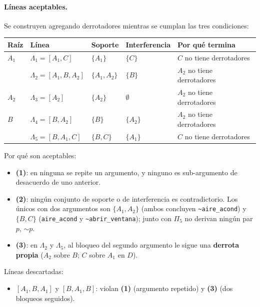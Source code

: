 \documentclass[11pt,a4paper]{article}
\newcommand{\nf}{\textasciitilde}                 %
\begin{document}
\paragraph{Líneas aceptables.} Se construyen agregando derrotadores mientras se cumplan las tres condiciones:
\begin{center}
\small
\begin{tabularx}{\linewidth}{@{}l l l l X@{}}
\toprule
\textbf{Raíz} & \textbf{Línea} & \textbf{Soporte} & \textbf{Interferencia} & \textbf{Por qué termina} \\
\midrule
$A_1$ & $\Lambda_1 = [A_1, C]$ & $\{A_1\}$ & $\{C\}$ & $C$ no tiene derrotadores \\
 & $\Lambda_2 = [A_1, B, A_2]$ & $\{A_1, A_2\}$ & $\{B\}$ & $A_2$ no tiene derrotadores \\
\midrule
$A_2$ & $\Lambda_3 = [A_2]$ & $\{A_2\}$ & $\emptyset$ & $A_2$ no tiene derrotadores \\
\midrule
$B$ & $\Lambda_4 = [B, A_2]$ & $\{B\}$ & $\{A_2\}$ & $A_2$ no tiene derrotadores \\
 & $\Lambda_5 = [B, A_1, C]$ & $\{B, C\}$ & $\{A_1\}$ & $C$ no tiene derrotadores \\
\bottomrule
\end{tabularx}
\end{center}

Por qué son aceptables:
\begin{itemize}
  \item \textbf{(1)}: en ninguna se repite un argumento, y ninguno es sub-argumento de desacuerdo de uno anterior.
  \item \textbf{(2)}: ningún conjunto de soporte o de interferencia es contradictorio. Los únicos con dos argumentos son $\{A_1, A_2\}$ (ambos concluyen \texttt{\nf aire\_acond}) y $\{B, C\}$ (\texttt{aire\_acond} y \texttt{\nf abrir\_ventana}); junto con $\Pi_5$ no derivan ningún par $p$, ${\sim}p$.
  \item \textbf{(3)}: en $\Lambda_2$ y $\Lambda_5$, al bloqueo del segundo argumento le sigue una \textbf{derrota propia} ($A_2$ sobre $B$; $C$ sobre $A_1$ en $D$).
\end{itemize}

Líneas descartadas:
\begin{itemize}
  \item $[A_1, B, A_1]$ y $[B, A_1, B]$: violan \textbf{(1)} (argumento repetido) y \textbf{(3)} (dos bloqueos seguidos).
\end{itemize}
\end{document}
